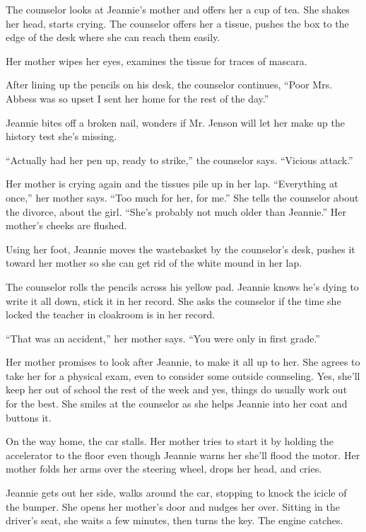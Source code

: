 \documentclass[
]{article}
\begin{document}
The counselor looks at Jeannie's mother and offers her a cup of tea. She
shakes her head, starts crying. The counselor offers her a tissue,
pushes the box to the edge of the desk where she can reach them easily.

Her mother wipes her eyes, examines the tissue for traces of mascara.

After lining up the pencils on his desk, the counselor continues, ``Poor
Mrs. Abbess was so upset I sent her home for the rest of the day.''

Jeannie bites off a broken nail, wonders if Mr. Jenson will let her make
up the history test she's missing.

``Actually had her pen up, ready to strike,'' the counselor says.
``Vicious attack.''

Her mother is crying again and the tissues pile up in her lap.
``Everything at once,'' her mother says. ``Too much for her, for me.''
She tells the counselor about the divorce, about the girl. ``She's
probably not much older than Jeannie.'' Her mother's cheeks are flushed.

Using her foot, Jeannie moves the wastebasket by the counselor's desk,
pushes it toward her mother so she can get rid of the white mound in her
lap.

The counselor rolls the pencils across his yellow pad. Jeannie knows
he's dying to write it all down, stick it in her record. She asks the
counselor if the time she locked the teacher in cloakroom is in her
record.

``That was an accident,'' her mother says. ``You were only in first
grade.''

Her mother promises to look after Jeannie, to make it all up to her. She
agrees to take her for a physical exam, even to consider some outside
counseling. Yes, she'll keep her out of school the rest of the week and
yes, things do usually work out for the best. She smiles at the
counselor as she helps Jeannie into her coat and buttons it.

On the way home, the car stalls. Her mother tries to start it by holding
the accelerator to the floor even though Jeannie warns her she'll flood
the motor. Her mother folds her arms over the steering wheel, drops her
head, and cries.

Jeannie gets out her side, walks around the car, stopping to knock the
icicle of the bumper. She opens her mother's door and nudges her over.
Sitting in the driver's seat, she waits a few minutes, then turns the
key. The engine catches.
\end{document}
